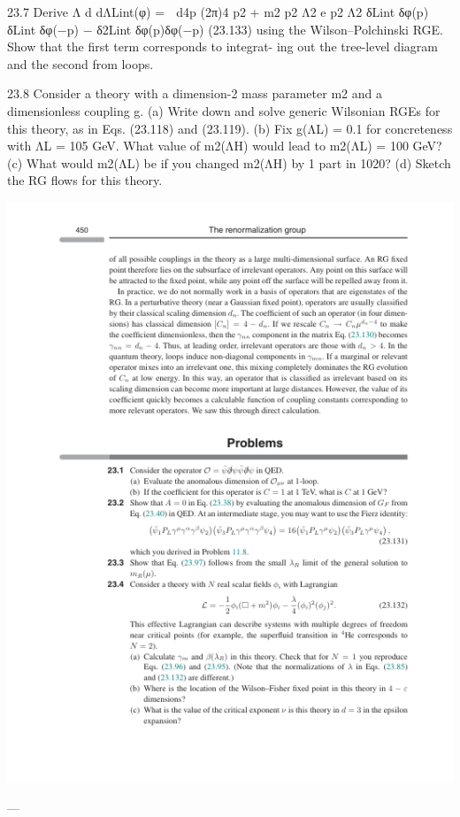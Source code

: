 23.7 Derive
Λ d
dΛLint(φ) =

d4p (2π)4
p2 + m2
p2
Λ2 e
p2
Λ2
δLint
δφ(p)
δLint
δφ(−p) −
δ2Lint
δφ(p)δφ(−p)
(23.133)
using the Wilson–Polchinski RGE. Show that the ﬁrst term corresponds to integrat-
ing out the tree-level diagram and the second from loops.

23.8 Consider a theory with a dimension-2 mass parameter m2 and a dimensionless
coupling g.
(a) Write down and solve generic Wilsonian RGEs for this theory, as in Eqs.
(23.118) and (23.119).
(b) Fix g(ΛL) = 0.1 for concreteness with ΛL = 105 GeV. What value of m2(ΛH)
would lead to m2(ΛL) = 100 GeV?
(c) What would m2(ΛL) be if you changed m2(ΛH) by 1 part in 1020?
(d) Sketch the RG ﬂows for this theory.

\includegraphics{./figs/23_The_renormalization_group_page_470.png}

---

